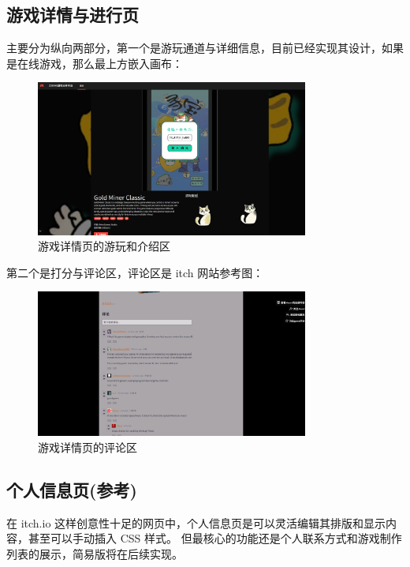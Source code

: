 \documentclass[12pt]{ctexart} %
\begin{document}
\subsection{游戏详情与进行页}

主要分为纵向两部分，第一个是游玩通道与详细信息，目前已经实现其设计，如果是在线游戏，那么最上方嵌入画布：

\begin{figure}[H]
  \centering
  \includegraphics[width=0.8\textwidth]{UI-detailed.png}
  \caption{游戏详情页的游玩和介绍区}
\end{figure}


第二个是打分与评论区，评论区是 itch 网站参考图：


\begin{figure}[H]
  \centering
  \includegraphics[width=0.8\textwidth]{UI-comment.png}
  \caption{游戏详情页的评论区}
\end{figure}

\subsection{个人信息页(参考)}

在 itch.io 这样创意性十足的网页中，个人信息页是可以灵活编辑其排版和显示内容，甚至可以手动插入 CSS 样式。
但最核心的功能还是个人联系方式和游戏制作列表的展示，简易版将在后续实现。
\end{document}
